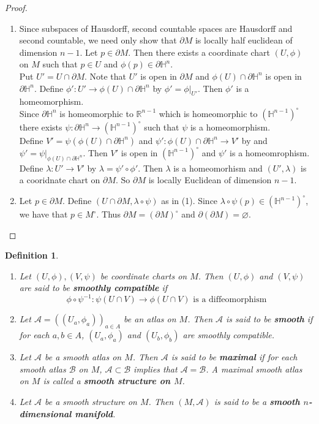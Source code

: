 \documentclass[12pt]{amsart}
\newtheorem{defn}[thm]{Definition}
\newcommand{\lam}{\lambda}
\renewcommand{\H}{\mathbb{H}}
\newcommand{\R}{\mathbb{R}}
\newcommand{\MA}{\mathcal{A}}
\newcommand{\MB}{\mathcal{B}}
\begin{document}
	\begin{proof}
		\begin{enumerate}
			\item Since subspaces of Hausdorff, second countable spaces are Hausdorff and second countable, we need only show that $\partial M$ is locally half euclidean of dimension $n-1$. Let $p \in \partial M$. Then there exists a coordinate chart $(U, \phi)$ on $M$ such that $p \in U$ and $\phi(p) \in \partial \H^n$. \\
			Put $U' = U \cap \partial M$. Note that $U'$ is open in $\partial M$ and $ \phi(U) \cap \partial \H^n$ is open in $\partial \H^n$. Define  $\phi': U' \rightarrow \phi(U) \cap \partial \H^n$ by $\phi' = \phi|_{U'}$. Then $\phi'$ is a homeomorphism. \\
			Since $\partial \H^n$ is homeomorphic to $\R^{n-1}$ which is homeomorphic to $(\H^{n-1})^{\circ}$ there exists $\psi: \partial \H^n \rightarrow (\H^{n-1})^{\circ}$ such that $\psi$ is a homeomorphism.\\ 
			Define $V' = \psi(\phi(U) \cap \partial \H^n)$ and $\psi': \phi(U) \cap \partial \H^n \rightarrow V' $ by and $\psi' = \psi|_{\phi(U) \cap \partial \H^n}$. Then $V'$ is open in $(\H^{n-1})^{\circ}$ and $\psi'$ is a homeomrophism. \\ 
			Define $\lam : U' \rightarrow V'$ by $\lam = \psi' \circ \phi'$. Then $\lam$ is a homeomorhism and $(U', \lam) $ is a cooridnate chart on $\partial M$. So $\partial M$ is locally Euclidean of dimension $n-1$.  
			\item Let $p \in \partial M$. Define $(U \cap \partial M, \lam \circ \psi)$ as in (1). Since $\lam \circ \psi(p) \in (\H^{n-1})^{\circ}$, we have that $p \in M^{\circ}$. Thus $ \partial M = (\partial M)^{\circ}$ and $\partial (\partial M) = \varnothing$.
		\end{enumerate}
	\end{proof}

	\begin{defn}\
		\begin{enumerate}
			\item Let $(U, \phi), (V, \psi)$ be coordinate charts on $M$. Then $(U, \phi)$ and $(V, \psi)$ are said to be \textbf{smoothly compatible} if $$\phi \circ \psi^{-1}: \psi(U \cap V) \rightarrow \phi (U \cap V) \text{ is a diffeomorphism}$$ 
			\item Let $\MA = ((U_a,\phi_{a}))_{a \in A}$ be an atlas on $M$. Then $\MA$ is said to be \textbf{smooth} if for each $a,b \in A$, $(U_a,\phi_{a})$ and $(U_b,\phi_{b})$ are smoothly compatible.
			\item Let $\MA$ be a smooth atlas on $M$. Then $\MA$ is said to be \textbf{maximal} if for each smooth atlas $\MB$ on $M$, $\MA \subset \MB$ implies that $\MA = \MB$. A maximal smooth atlas on $M$ is called a \textbf{smooth structure on $M$}.
			\item Let $\MA$ be a smooth structure on $M$. Then $(M, \MA)$ is said to be a \textbf{smooth $n$-dimensional manifold}. 
		\end{enumerate}
	\end{defn}
\end{document}
